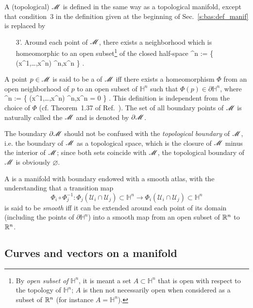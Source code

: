 A (topological)  $\mathscr{M}$ is defined in the same way
as a topological manifold, except that condition~3 in the definition given
at the beginning of Sec.~\ref{s:bas:def_manif} is replaced by
\begin{itemize}
\item[3'.] Around each point of $\mathscr{M}$, there exists a neighborhood which is
homeomorphic to an open subset\footnote{By \emph{open subset of} $\mathbb{H}^n$, it is meant a set $A\subset \mathbb{H}^n$ that is open with respect to the topology of $\mathbb{H}^n$; $A$ is then not necessarily open when considered
as a subset of $\mathbb{R}^n$ (for instance $A=\mathbb{H}^n$).}
of the closed half-space
\be
    ^n := \left\{ (x^1,\ldots,x^n) \in \R^n,\quad x^n  \right\} .
\ee
\end{itemize}
A point $p\in \mathscr{M}$ is said to be a  of $\mathscr{M}$ iff
there exists a homeomorphism $\Phi$ from an open neighborhood of $p$
to an open subset of $\mathbb{H}^n$ such that
$\Phi(p)\in \partial \mathbb{H}^n$, where
\be
    \partial{}^n := \left\{ (x^1,\ldots,x^n) \in \R^n,\quad x^n = 0 \right\} .
\ee
This definition is independent from the choice of $\Phi$ (cf. Theorem~1.37 of
Ref.~\cite{Lee13}).
The set of all boundary points of $\mathscr{M}$ is naturally called the
 $\mathscr{M}$ and is denoted by
$\partial\mathscr{M}$.
\begin{remark}
\label{r:bas:manifold_boundary}
The boundary $\partial\mathscr{M}$ should not be confused with the \emph{topological boundary}
of $\mathscr{M}$, i.e. the boundary of $\mathscr{M}$ as a topological space, which is
the closure of $\mathscr{M}$ minus the interior of $\mathscr{M}$; since
both sets coincide with $\mathscr{M}$, the topological boundary of $\mathscr{M}$
is obviously $\varnothing$.
\end{remark}

A  is a manifold with boundary endowed with a
smooth atlas, with the understanding that a transition map
\[
    \Phi_i \circ \Phi_j^{-1} : \Phi_j(\mathscr{U}_i \cap \mathscr{U}_j)
    \subset \mathbb{H}^n \longrightarrow \Phi_i(\mathscr{U}_i \cap \mathscr{U}_j)
    \subset \mathbb{H}^n
\]
is said to be \emph{smooth} iff
it can be extended around each point of its domain
(including the points of $\partial\mathbb{H}^n$) into a smooth map
from an open subset of $\mathbb{R}^n$ to $\mathbb{R}^n$.

\subsection{Curves and vectors on a manifold} \label{s:bas:vectors}

